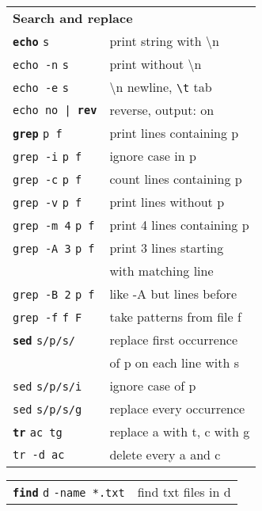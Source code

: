 \documentclass[a4paper,10pt,landscape]{report}
\newcommand{\boxtitle}[1]{{\textbf{\color{RubineRed}#1}}}
\newcommand{\example}[1]{{\texttt{\color{RubineRed}#1}}}
\newcommand{\labbr}[1]{{\texttt{\color{Red}#1}}}
\newcommand{\rabbr}[1]{{\color{Red}#1}}
\newcommand{\co}[1]{\texttt{#1}}
\newcommand{\cob}[1]{\texttt{\textbf{#1}}} %
\begin{document}
\begin{multicols}{4}
\begin{mdframed}[style=mybox]
\begin{tabular}{ l l }
\multicolumn{2}{l}{\boxtitle{Search and replace}} \\
\cob{echo} \labbr{s}   & print string with \rabbr{\textbackslash{}n}\\
\co{echo -n} \labbr{s} & print without \rabbr{\textbackslash{}n}\\
\co{echo -e} \labbr{s} & \rabbr{\textbackslash{}n} newline,
\labbr{\textbackslash{}t} tab\\
\example{echo no | \cob{rev}}        & reverse, output: on \\
\cob{grep} \labbr{p f}              & print lines containing \rabbr{p} \\
\co{grep -i} \labbr{p f}            & ignore case in \rabbr{p} \\
\co{grep -c} \labbr{p f}            & count lines containing \rabbr{p} \\
\co{grep -v} \labbr{p f}            & print lines without \rabbr{p} \\
\co{grep -m 4} \labbr{p f}          & print 4 lines containing \rabbr{p} \\
\co{grep -A 3} \labbr{p f}          & print 3 lines starting \\
                                 & with matching line \\
\co{grep -B 2} \labbr{p f}          & like -A but lines before \\
\co{grep -f} \labbr{f F}            & take patterns from file \rabbr{f} \\
\cob{sed} \co{s/\labbr{p}/\labbr{s}/}  & replace first occurrence \\
                                 & of \rabbr{p} on each line with \rabbr{s} \\
\co{sed} \co{s/\labbr{p}/\labbr{s}/i}  & ignore case of \rabbr{p} \\
\co{sed} \co{s/\labbr{p}/\labbr{s}/g}  & replace every occurrence \\
\cob{tr} \co{ac tg}              & replace a with t, c with g\\
\co{tr -d ac}                    & delete every a and c \\
\end{tabular}
\begin{tabular}{ l l }
\cob{find} \labbr{d} \co{-name *.txt}    & find txt files in \rabbr{d} \\
\end{tabular}
\end{mdframed}


\end{multicols}
\end{document}

